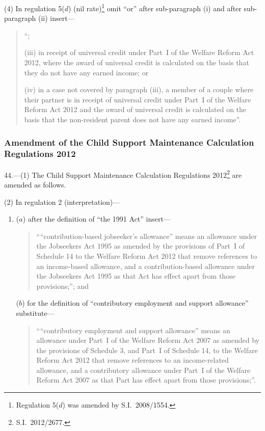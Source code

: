 \documentclass[12pt,a4paper]{article}
\begin{document}
(4) In regulation 5($d$)  (nil rate)\footnote{Regulation 5($d$) was amended by S.I.~2008/1554.} omit “or” after sub-paragraph (i)  and after sub-paragraph (ii)  insert—
\begin{quotation}
“;

(iii) in receipt of universal credit under Part~I of the Welfare Reform Act 2012, where the award of universal credit is calculated on the basis that they do not have any earned income; or

(iv) in a case not covered by paragraph (iii), a member of a couple where their partner is in receipt of universal credit under Part~I of the Welfare Reform Act 2012 and the award of universal credit is calculated on the basis that the non-resident parent does not have any earned income”.
\end{quotation}

\subsubsection[44. Amendment of the Child Support Maintenance Calculation Regulations 2012]{Amendment of the Child Support Maintenance Calculation Regulations 2012}

44.—(1) The Child Support Maintenance Calculation Regulations 2012\footnote{S.I.~2012/2677.} are amended as follows.

(2) In regulation 2 (interpretation)—
\begin{enumerate}\item[]
($a$) after the definition of “the 1991 Act” insert—
\begin{quotation}
““contribution-based jobseeker’s allowance” means an allowance under the Jobseekers Act 1995 as amended by the provisions of Part~I of Schedule 14 to the Welfare Reform Act 2012 that remove references to an income-based allowance, and a contribution-based allowance under the Jobseekers Act 1995 as that Act has effect apart from those provisions;”; and
\end{quotation}

($b$) for the definition of “contributory employment and support allowance” substitute—
\begin{quotation}
““contributory employment and support allowance” means an allowance under Part~I of the Welfare Reform Act 2007 as amended by the provisions of Schedule 3, and Part~I of Schedule 14, to the Welfare Reform Act 2012 that remove references to an income-related allowance, and a contributory allowance under Part~I of the Welfare Reform Act 2007 as that Part has effect apart from those provisions;”.
\end{quotation}
\end{enumerate}
\end{document}
